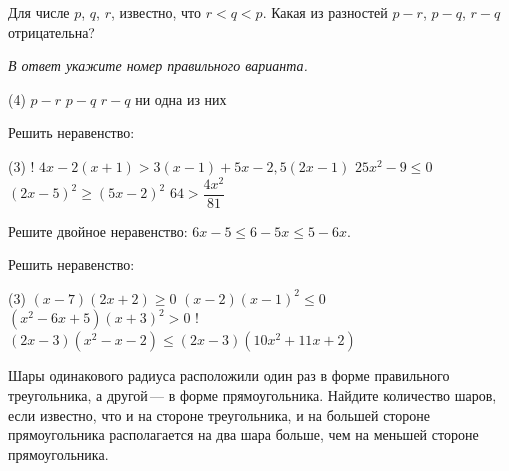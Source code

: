 %
%
%
%	

%
%
\begin{class}[number=7]
	\begin{listofex}
		\item Для числе \( p \), \( q \), \( r \), известно, что \( r<q<p \). Какая из разностей \( p-r \), \( p-q \), \( r-q \) отрицательна?
		
		\textit{В ответ укажите номер правильного варианта.}
		\begin{tasks}(4)
			\task \( p-r \)
			\task \( p-q \)
			\task \( r-q \)
			\task ни одна из них
		\end{tasks}
		\item Решить неравенство:
		\begin{tasks}(3)
			\task! \( 4x-2(x+1)>3(x-1)+5x-2,5(2x-1) \)
			\task \( 25x^2-9\le0 \)
			\task \( (2x-5)^2\ge(5x-2)^2 \)
			\task \( 64>\dfrac{4x^2}{81} \)
		\end{tasks}
		\item Решите двойное неравенство: \( 6x-5\le6-5x\le5-6x \).
		\item Решить неравенство:
		\begin{tasks}(3)
			\task \( (x-7)(2x+2)\ge0 \)
			\task \( (x-2)(x-1)^2\le0 \)
			\task \( (x^2-6x+5)(x+3)^2>0 \)
			\task! \( (2x-3)(x^2-x-2)\le(2x-3)(10x^2+11x+2) \)
		\end{tasks}
		\item Шары одинакового радиуса расположили один раз в форме правильного треугольника,
		а другой --- в форме прямоугольника. Найдите количество шаров,
		если известно, что и на стороне треугольника,
		и на большей стороне прямоугольника располагается на два шара больше,
		чем на меньшей стороне прямоугольника.
	\end{listofex}
\end{class}
%
%
%	

